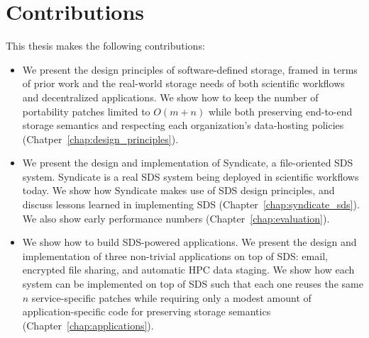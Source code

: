 \section{Contributions}

This thesis makes the following contributions:

\begin{itemize}

\item We present the design principles of software-defined storage, framed in
terms of prior work and the real-world storage needs of both scientific
workflows and decentralized applications.  We show how to
keep the number of portability patches limited to $O(m + n)$ while
both preserving end-to-end storage semantics and
respecting each organization's data-hosting policies
(Chatper~\ref{chap:design_principles}).

\item We present the design and implementation of Syndicate, a file-oriented SDS
system.  Syndicate is a real SDS system being deployed in scientific workflows today.
We show how Syndicate makes use of SDS design principles, and discuss lessons
learned in implementing SDS (Chapter~\ref{chap:syndicate_sds}).
We also show early performance numbers (Chapter~\ref{chap:evaluation}).

\item We show how to build SDS-powered applications.  We present the design and
implementation of three non-trivial applications on top of SDS: email, encrypted
file sharing, and automatic HPC data staging.  We show how each system can be
implemented on top of SDS such that each one reuses the same $n$
service-specific patches while requiring only a modest amount of
application-specific code for preserving storage semantics
(Chapter~\ref{chap:applications}).

\end{itemize}

